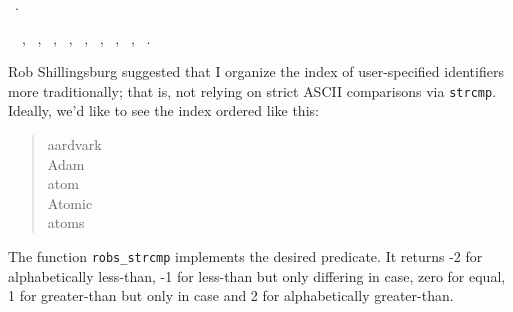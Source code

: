 \documentclass[a4paper]{report}
\begin{document}
\begin{flushleft}
\begin{minipage}{\linewidth}
\vspace{-1.5ex}
\footnotesize
\begin{list}{}{\setlength{\itemsep}{-\parsep}\setlength{\itemindent}{-\leftmargin}}
\item \NWtxtFileDefBy\ .
\item \NWtxtIdentsUsed\nobreak\  \verb@compare@\nobreak\ , \verb@EQUAL@\nobreak\ , \verb@EXTENSION@\nobreak\ , \verb@FALSE@\nobreak\ , \verb@GREATER@\nobreak\ , \verb@LESS@\nobreak\ , \verb@Name@\nobreak\ , \verb@PREFIX@\nobreak\ , \verb@TRUE@\nobreak\ .
\item{}
\end{list}
\end{minipage}\vspace{4ex}
\end{flushleft}
Rob Shillingsburg suggested that I organize the index of
user-specified identifiers more traditionally; that is, not relying on
strict {\small ASCII} comparisons via \verb|strcmp|. Ideally, we'd like
to see the index ordered like this:
\begin{quote}
\begin{flushleft}
aardvark \\
Adam \\
atom \\
Atomic \\
atoms
\end{flushleft}
\end{quote}
The function \verb|robs_strcmp| implements the desired predicate.
It returns -2 for alphabetically less-than, -1 for less-than but only
differing in case, zero for equal, 1 for greater-than but only in case
and 2 for alphabetically greater-than.
\end{document}
